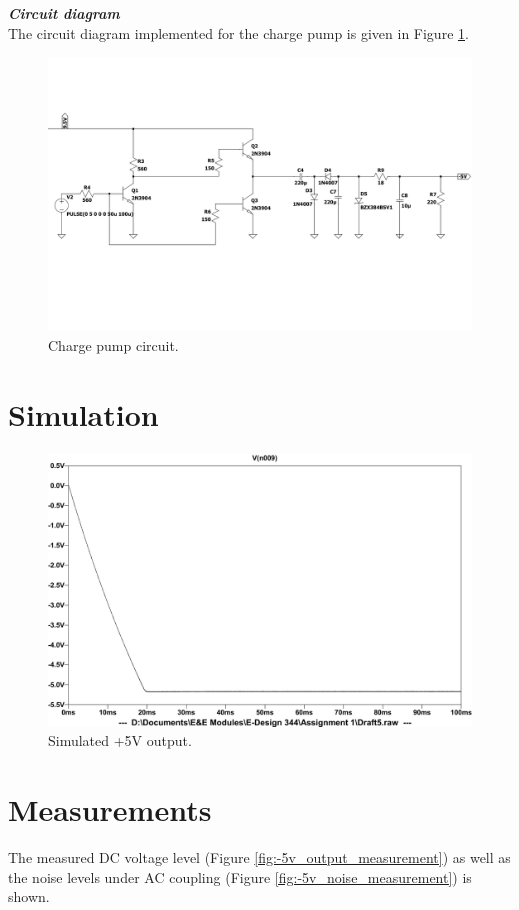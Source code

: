 \noindent\textbf{\textit{Circuit diagram}} \\
The circuit diagram implemented for the charge pump is given in Figure \ref{fig:chargepump_circuit}.
\begin{figure}[h] 
 \centering
  	\includegraphics[clip, trim = 0cm 4.2cm 0cm 2.8cm, width=1\linewidth]{./Figures/chargepump_circuit.pdf}
  	\caption{Charge pump circuit.}
  	\label{fig:chargepump_circuit}
 \end{figure}
 
 

\section{Simulation} \label{sec:simulation_chargepump}
\begin{figure}[h] 
 \centering
  	\includegraphics[width=0.6\linewidth]{./Figures/chargepump_simulate.pdf}
  	\caption{Simulated +5V output.}
  	\label{fig:-5v_simulation}
 \end{figure}
 
 
\section{Measurements} \label{sec:measurements_chargepump}
The measured DC voltage level (Figure \ref{fig:-5v_output_measurement}) as well as the noise levels under AC coupling (Figure \ref{fig:-5v_noise_measurement}) is shown.



